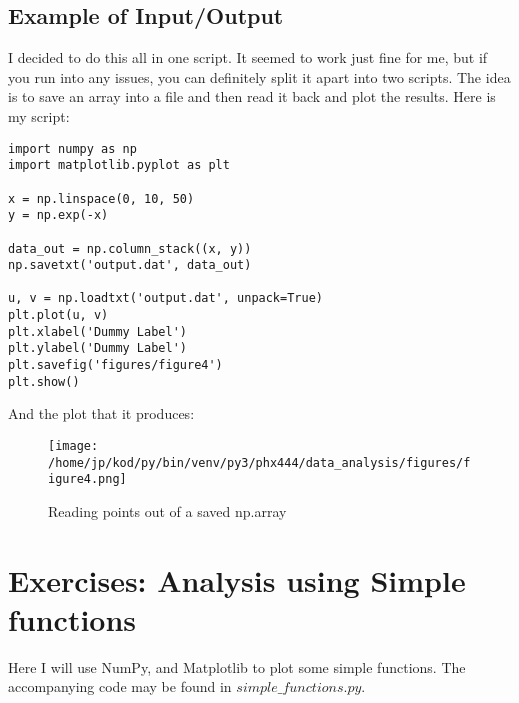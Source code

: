 \documentclass{article}
\begin{document}
\subsection{Example of Input/Output}
I decided to do this all in one script. It seemed to work just fine for me, but
if you run into any issues, you can definitely split it apart into two
scripts. The idea is to save an array into a file and then read it back and
plot the results. Here is my script:

\begin{center}
\begin{minipage}[t]{.80\textwidth}
\begin{lstlisting}[caption=Input / Output, frame=tlrb]
import numpy as np
import matplotlib.pyplot as plt

x = np.linspace(0, 10, 50)
y = np.exp(-x)

data_out = np.column_stack((x, y))
np.savetxt('output.dat', data_out)

u, v = np.loadtxt('output.dat', unpack=True)
plt.plot(u, v)
plt.xlabel('Dummy Label')
plt.ylabel('Dummy Label')
plt.savefig('figures/figure4')
plt.show()
\end{lstlisting}
\end{minipage}
\end{center}

And the plot that it produces:
\begin{figure}[H]
        \begin{center}
        \texttt{[image: /home/jp/kod/py/bin/venv/py3/phx444/data\_analysis/figures/figure4.png]}
        \caption{Reading points out of a saved np.array}
        \label{fig:fig_4}
        \end{center}
\end{figure}

\section{Exercises: Analysis using Simple functions}
Here I will use NumPy, and Matplotlib to plot some simple functions. The
accompanying code may be found in $simple\_functions.py$.
\end{document}
